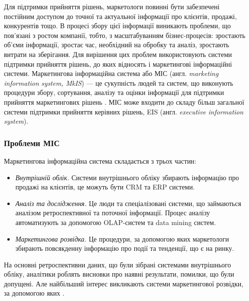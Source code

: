 Для підтримки прийняття рішень, маркетологи повинні бути забезпечені постійним доступом до точної та актуальної інформації про клієнтів, продажі, конкурентів тощо. В процесі збору цієї інформації виникають проблеми, що пов’язані з ростом компанії, тобто, з масштабуванням бізнес-процесів: зростають об’єми інформації, зростає час, необхідний на обробку та аналіз, зростають витрати на зберігання. Для вирішення цих проблем використовують системи підтримки прийняття рішень, до яких відносять і маркетингові інформаційні системи. Маркетингова інформаційна система або МІС (англ. {\it marketing information system, MkIS}) --- це сукупність людей та систем, що виконують процедури збору, сортування, аналізу та оцінки інформації для підтримки прийняття маркетингових рішень \cite{kotler14}. МІС може входити до складу більш загальної системи підтримки прийняття керівних рішень, EIS (англ. {\it executive information system}).
    
\subsubsection{Проблеми МІС}
Маркетингова інформаційна система складається з трьох частин\cite{kotler14}:
\begin{itemize}
\item {\it Внутрішній облік.} Системи внутрішнього обліку збирають інформацію про продажі на клієнтів, це можуть бути CRM та ERP системи.
\item {\it Аналіз та дослідження.} Це люди та спеціалізовані системи, що займаються аналізом ретроспективної та поточної інформації. Процес аналізу автоматизують за допомогою OLAP-систем та data mining систем.
\item {\it Маркетингова розвідка.} Це процедури, за допомогою яких маркетологи збирають повсякденну інформацію про події та тенденції, що є на ринку. 
\end{itemize}
На основні ретроспективни даних, що були зібрані системами внутрішнього обліку, аналітики роблять висновки про наявні результати, помилки, що були допущені. Але найбільший інтерес викликають системи маркетингової розвідки, за допомогою яких	 .   
%    
%

